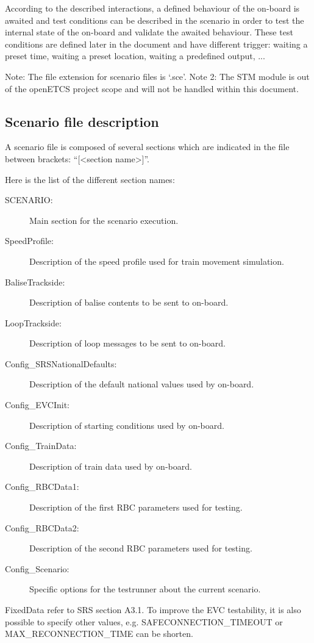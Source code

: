 \documentclass{template/openetcs}
\begin{document}
According to the described interactions, a defined behaviour of the on-board is awaited and test conditions can be described in the scenario in order to test the internal state of the on-board and validate the awaited behaviour. These test conditions are defined later in the document and have different trigger: waiting a preset time, waiting a preset location, waiting a predefined output, ... 

Note: The file extension for scenario files is ‘.sce’.
\newline
Note 2: The STM module is out of the openETCS project scope and will not be handled within this document.

\subsection{Scenario file description}

A scenario file is composed of several sections which are indicated in the file between brackets: “[<section name>]”.

Here is the list of the different section names:

\begin{description}
	\item[SCENARIO:] Main section for the scenario execution.
	\item[SpeedProfile:] Description of the speed profile used for train movement simulation.
	\item[BaliseTrackside:] Description of balise contents to be sent to on-board.
	\item[LoopTrackside:] Description of loop messages to be sent to on-board.
	\item[Config\_SRSNationalDefaults:] Description of the default national values used by on-board.
	\item[Config\_EVCInit:] Description of starting conditions used by on-board.
	\item[Config\_TrainData:] Description of train data used by on-board. 
	\item[Config\_RBCData1:] Description of the first RBC parameters used for testing. 
	\item[Config\_RBCData2:] Description of the second RBC parameters used for testing. 
	\item[Config\_Scenario:] Specific options for the testrunner about the current scenario.
\end{description}

FixedData refer to SRS section A3.1. To improve the EVC testability, it is also possible to specify other values, e.g. SAFECONNECTION\_TIMEOUT or MAX\_RECONNECTION\_TIME can be shorten.
\end{document}
